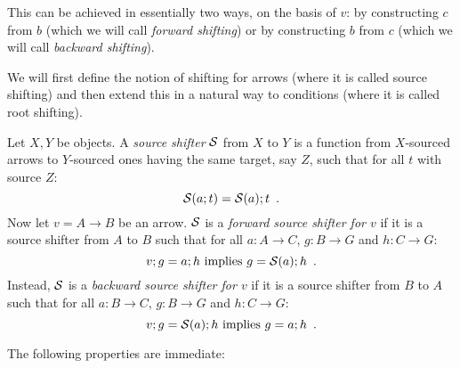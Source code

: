 This can be achieved in essentially two ways, on the basis of $v$: by constructing $c$ from $b$ (which we will call \emph{forward shifting}) or by constructing $b$ from $c$ (which we will call \emph{backward shifting}).
%

We will first define the notion of shifting for arrows (where it is called source shifting) and then extend this in a natural way to conditions (where it is called root shifting).
%

\begin{definition}
Let $X,Y$ be objects. A \emph{source shifter} $\mathcal{S}$ from $X$ to $Y$ is a function from $X$-sourced arrows to $Y$-sourced ones having the same target, say $Z$, such that for all $t$ with source $Z$:
%
\begin{equation}\eqlabel{shifters are functors}
\cS(a;t) = \cS(a);t \enspace.
\end{equation}
%
Now let $v=A\to B$ be an arrow. $\mathcal{S}$ is a \emph{forward source shifter for $v$} if it  is a source shifter from $A$ to $B$ such that for all $a:A\to C$, $g:B\to G$ and $h:C\to G$:
%
\begin{equation}\eqlabel{forward condition}
v;g = a;h \text{ implies } g = \cS(a);h \enspace.
\end{equation}
%
Instead, $\mathcal{S}$ is a \emph{backward source shifter for $v$} if it is a source shifter from $B$ to $A$ such that for all $a:B\to C$, $g:B\to G$ and $h:C\to G$:
%
\begin{equation}\eqlabel{backward condition}
v;g = \cS(a);h \text{ implies } g = a;h \enspace.
\end{equation}
%
\end{definition}
%
The following properties are immediate:
%
